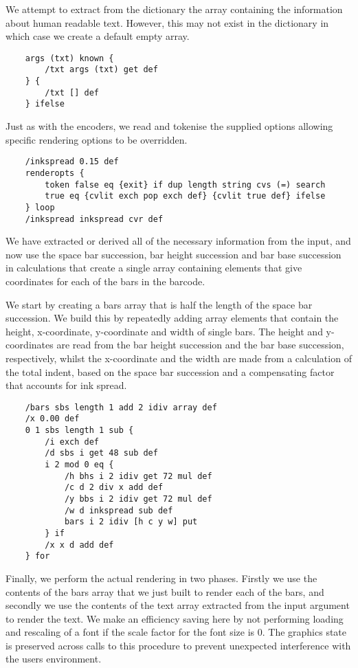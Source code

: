 \documentclass []{article}
\begin{document}
We attempt to extract from the dictionary the array containing the
information about human readable text. However, this may not exist 
in the dictionary in which case we create a default empty array.

\begin{verbatim}
    args (txt) known {
        /txt args (txt) get def
    } {
        /txt [] def
    } ifelse
\end{verbatim}

Just as with the encoders, we read and tokenise the supplied options
allowing specific rendering options to be overridden.

\begin{verbatim}
    /inkspread 0.15 def
    renderopts {
        token false eq {exit} if dup length string cvs (=) search
        true eq {cvlit exch pop exch def} {cvlit true def} ifelse
    } loop
    /inkspread inkspread cvr def
\end{verbatim}

We have extracted or derived all of the necessary information 
from the input, and now use the space bar succession, bar height 
succession and bar base succession in calculations that create a 
single array containing elements that give coordinates for each of
the bars in the barcode.

We start by creating a bars array that is half the length of the 
space bar succession. We build this by repeatedly adding array elements 
that contain the height, x-coordinate, y-coordinate and width of
single bars. The height and y-coordinates are read from the bar
height succession and the bar base succession, respectively, whilst
the x-coordinate and the width are made from a calculation of the 
total indent, based on the space bar succession and a compensating
factor that accounts for ink spread.

\begin{verbatim}    
    /bars sbs length 1 add 2 idiv array def
    /x 0.00 def
    0 1 sbs length 1 sub {
        /i exch def
        /d sbs i get 48 sub def
        i 2 mod 0 eq {
            /h bhs i 2 idiv get 72 mul def
            /c d 2 div x add def
            /y bbs i 2 idiv get 72 mul def
            /w d inkspread sub def            
            bars i 2 idiv [h c y w] put
        } if
        /x x d add def  
    } for
\end{verbatim}

Finally, we perform the actual rendering in two phases. Firstly we
use the contents of the bars array that we just built to render each 
of the bars, and secondly we use the contents of the text array 
extracted from the input argument to render the
text. We make an efficiency saving here by not performing loading and
rescaling of a font if the scale factor for the font size is 0. The graphics
state is preserved across calls to this procedure to prevent 
unexpected interference with the users environment.
\end{document}
